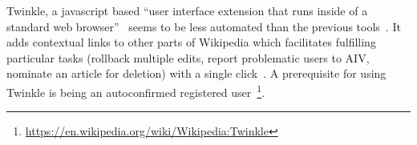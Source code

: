 \begin{comment}
\url{https://en.wikipedia.org/wiki/Wikipedia:STiki/leaderboard}

"Above all else, it should be emphasized that STiki is not a competition."
//compare also~\cite{HalRied2012} who warn against Wikipedia becoming gamified with vandals being "monsters"

" STiki users who operate the tool recklessly in the hope of inflating their statistics are not helping themselves or the project "

\url{https://en.wikipedia.org/wiki/Wikipedia:STiki}

"STiki is a tool available to trusted users that is used to detect and revert vandalism, spam, and other types of unconstructive edits made at Wikipedia. "

"STiki chooses edits to show to end users; if a displayed edit is judged to be vandalism, spam, etc., STiki streamlines the reversion and warning process. STiki facilitates collaboration in reverting vandalism; a centrally stored lists of edits to be inspected are served to STiki users to reduce redundant effort."

"STiki may only be used by editors with a Wikipedia account. Additionally, the account must meet some qualifications to reduce the probability of users misidentifying vandalism."

"The account must have any one of: (1) the rollback permission/right, (2) at least 1000 article edits (in the article namespace, not to talk/user pages), or (3) special permission via the talk page. We emphasize that users must take responsibility for their actions with STiki. "

"After login, users primarily interact with the GUI tool by classifying edits into one of four categories:
vandalism
good faith revert
pass
innocent "
//interestingly, at the initial tool presentation~\cite{WestKanLee2010}, there was no "good faith" option. It seemed to have been added quite promptly after though, since the screenshot of the tool on the page has the button already and claims to have been made on 28 February 2010

"Uncertainty over malice: It can be tricky to differentiate between vandalism and good-faith edits that are nonetheless unconstructive. "
\end{comment}

Twinkle, a javascript based ``user interface extension that runs inside of a standard web browser''~\cite{GeiRib2010} seems to be less automated than the previous tools~\cite{GeiHal2013}.
It adds contextual links to other parts of Wikipedia which facilitates fulfilling particular tasks (rollback multiple edits, report problematic users to AIV, nominate an article for deletion) with a single click~\cite{GeiRib2010}.
A prerequisite for using Twinkle is being an autoconfirmed registered user~\footnote{\url{https://en.wikipedia.org/wiki/Wikipedia:Twinkle}}.

